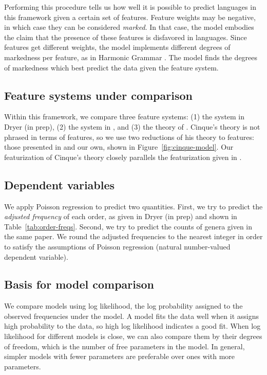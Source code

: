 \documentclass[11pt]{article}
\begin{document}
Performing this procedure tells us how well it is possible to predict languages in this framework given a certain set of features.
Feature weights may be negative, in which case they can be considered \emph{marked}. In that case, the model embodies the claim that the presence of these features is disfavored in languages.
Since features get different weights, the model implements different degrees of markedness per feature, as in Harmonic Grammar \citep{smolensky2006harmonic}.
The model finds the degrees of markedness which best predict the data given the feature system.

\subsection{Feature systems under comparison}

Within this framework, we compare three feature systems: (1) the system in Dryer (in prep), (2) the system in \citet{cysouw2010dealing}, and (3) the theory of \citet{cinque2005deriving}. Cinque's theory is not phrased in terms of features, so we use two reductions of his theory to features: those presented in \citet{merlo2015predicting} and our own, shown in Figure~\ref{fig:cinque-model}. Our featurization of Cinque's theory closely parallels the featurization given in \citet{cysouw2010dealing}.

\subsection{Dependent variables}

We apply Poisson regression to predict two quantities. First, we try to predict the \emph{adjusted frequency} of each order, as given in Dryer (in prep) and shown in Table~\ref{tab:order-freqs}. Second, we try to predict the counts of genera given in the same paper.
We round the adjusted frequencies to the nearest integer in order to satisfy the assumptions of Poisson regression (natural number-valued dependent variable). 

\subsection{Basis for model comparison}

We compare models using log likelihood, the log probability assigned to the observed frequencies under the model.
A model fits the data well when it assigns high probability to the data, so high log likelihood indicates a good fit.
When log likelihood for different models is close, we can also compare them by their degrees of freedom, which is the number of free parameters in the model.
In general, simpler models with fewer parameters are preferable over ones with more parameters.
\end{document}
